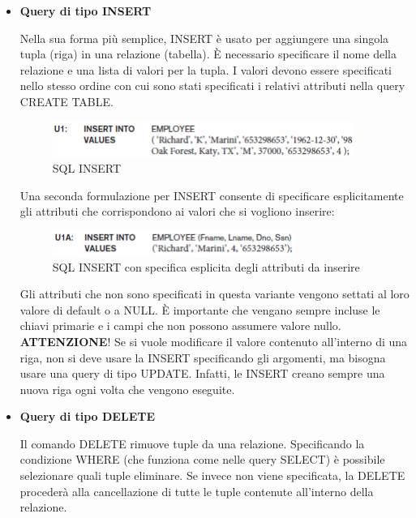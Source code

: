 \begin{itemize}

\item{\textbf{Query di tipo INSERT}}

Nella sua forma più semplice, INSERT è usato per aggiungere una singola tupla (riga) in una relazione (tabella). È necessario specificare il nome della relazione e una lista di valori per la tupla. I valori devono essere specificati nello stesso ordine con cui sono stati specificati i relativi attributi nella query CREATE TABLE.

\begin{center}
\begin{figure}[H]
\centering
\includegraphics[scale=1]{figures/insert.png}
\caption{SQL INSERT} 
\end{figure}
\end{center}

Una seconda formulazione per INSERT consente di specificare esplicitamente gli attributi che corrispondono ai valori che si vogliono inserire:

\begin{center}
\begin{figure}[H]
\centering
\includegraphics[scale=1]{figures/insert2.png}
\caption{SQL INSERT con specifica esplicita degli attributi da inserire} 
\end{figure}
\end{center}

Gli attributi che non sono specificati in questa variante vengono settati al loro valore di default o a NULL. È importante che vengano sempre incluse le chiavi primarie e i campi che non possono assumere valore nullo. \textbf{ATTENZIONE}! Se si vuole modificare il valore contenuto all’interno di una riga, non si deve usare la INSERT specificando gli argomenti, ma bisogna usare una query di tipo UPDATE. Infatti, le INSERT creano sempre una nuova riga ogni volta che vengono eseguite.  

\item{\textbf{Query di tipo DELETE}}

Il comando DELETE rimuove tuple da una relazione. Specificando la condizione WHERE (che funziona come nelle query SELECT) è possibile selezionare quali tuple eliminare. Se invece non viene specificata, la DELETE procederà alla cancellazione di tutte le tuple contenute all’interno della relazione. 


\end{itemize}
